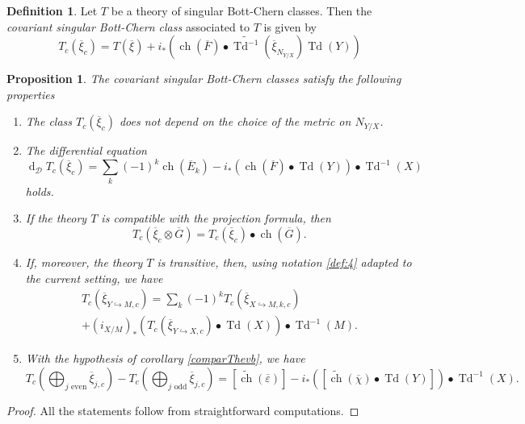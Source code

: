 \documentclass[10pt,twoside]{article}
\numberwithin{equation}{section}
\theoremstyle{plain}
\newtheorem{proposition}[equation]{Proposition}
\theoremstyle{definition}
\newtheorem{definition}[equation]{Definition}
\DeclareMathOperator{\Td}{Td}
\DeclareMathOperator{\dd}{d}
\DeclareMathOperator{\ch}{ch}
\begin{document}
\begin{definition} \label{def:18}
  Let $T$ be a theory of singular Bott-Chern classes.
  Then the \emph{covariant singular Bott-Chern class} associated to
  $T$ is given by
  \begin{equation}
    \label{eq:85}
    T_{c}(\overline {\xi}_{c})=
    T(\overline {\xi})+i_{\ast}(\ch(\overline F)\bullet
    \widetilde{\Td^{-1}}(\overline{\xi}_{N_{Y/X}})\Td(Y)) 
  \end{equation}
\end{definition}

\begin{proposition}\label{prop:17}
  The covariant singular Bott-Chern classes satisfy the following
  properties
  \begin{enumerate}
  \item The class $T_{c}(\overline {\xi}_{c})$ does not depend on the
    choice of the metric on $N_{Y/X}$.
  \item The differential equation
    \begin{equation}
      \label{eq:86}
      \dd_{\mathcal{D}}T_{c}(\overline {\xi}_{c})=
      \sum_{k}(-1)^{k}\ch(\overline E_{k})-
      i_{\ast}(\ch(\overline F)\bullet \Td(Y))\bullet \Td^{-1}(X)
    \end{equation}
    holds.
  \item If the theory $T$ is compatible with the projection formula, then
    \begin{displaymath}
      T_{c}(\overline {\xi}_{c}\otimes \overline G)=
      T_{c}(\overline {\xi}_{c})\bullet \ch(\overline G).
    \end{displaymath}
  \item If, moreover, the theory $T$ is transitive, then, using
    notation \ref{def:4} adapted to the current setting, we have
    \begin{multline}
      \label{eq:87}
       T_{c}(\overline \xi_{Y\hookrightarrow M,c})=
    \sum_{k}(-1)^{k}T_{c}(\overline \xi _{X\hookrightarrow
      M,k,c})\\+(i_{X/M})_{\ast}(T_{c}(\overline \xi_{Y\hookrightarrow X,c})\bullet
    \Td(X))\bullet \Td^{-1}(M).
    \end{multline}
  \item With the hypothesis of corollary \ref{comparThevb}, we have
  \begin{equation}\label{eq:88}
    T_{c}(\bigoplus_{j \text{ even} }\overline{\xi}_{j,c}) - T_{c}(\bigoplus
    _{j\text{ odd} }\overline {\xi}_{j,c})=
    [\widetilde{\ch}(\overline \varepsilon )]-
    i_{\ast}([\widetilde{\ch}(\overline{\chi})\bullet \Td(Y)])\bullet 
    \Td^{-1}(X).
  \end{equation} 
  \end{enumerate}
\end{proposition}
\begin{proof}
  All the statements follow from straightforward computations.
\end{proof}
\end{document}

